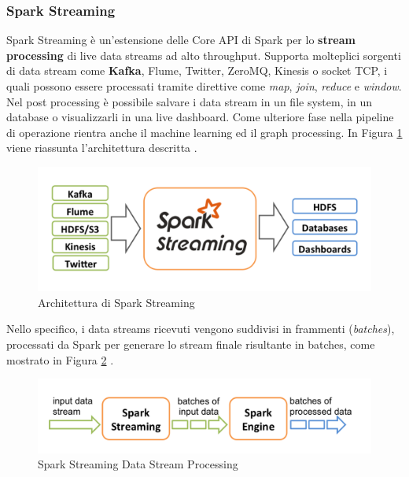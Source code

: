 \documentclass[12pt]{article}
\begin{document}
\subsubsection{Spark Streaming}

Spark Streaming è un'estensione delle Core API di Spark per lo\textbf{ stream processing} di live data streams ad alto throughput. Supporta molteplici sorgenti di data stream come\textbf{ Kafka}, Flume, Twitter, ZeroMQ, Kinesis o socket TCP, i quali possono essere processati tramite direttive come \textit{map}, \textit{join}, \textit{reduce} e \textit{window}. Nel post processing è possibile salvare i data stream in un file system, in un database o visualizzarli in una live dashboard. Come ulteriore fase nella pipeline di operazione rientra anche il machine learning ed il graph processing. In Figura \ref{spark-streaming} viene riassunta l'architettura descritta \cite{spark}. 

\begin{figure}[H]
	\centering
	\includegraphics[scale=0.50]{images/streaming-arch.png}
	\caption{Architettura di Spark Streaming \cite{spark}}
	\label{spark-streaming}
\end{figure}

Nello specifico, i data streams ricevuti vengono suddivisi in frammenti (\textit{batches}), processati da Spark per generare lo stream finale risultante in batches, come mostrato in Figura \ref{spark-streaming-processing} \cite{spark}.

\begin{figure}[H]
	\centering
	\includegraphics[scale=0.50]{images/streaming-flow.png}
	\caption{Spark Streaming Data Stream Processing \cite{spark}}
	\label{spark-streaming-processing}
\end{figure}
\end{document}
